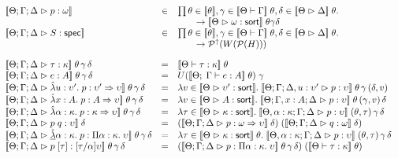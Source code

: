 \begin{figure}
\begin{displaymath}
\begin{array}{lcl}
\interp{\judgeA{p}{\omega}} & \in & \prod \theta \in \interp{\theta}, \gamma \in \interp{\judgectx{\Theta}{\Gamma}}\;\theta, \delta \in \interp{\judgeACtx{\Delta}}\;\theta.\\
                            &     & \qquad \to \interp{\judgeSort{\omega}}\;\theta \gamma \delta \\
\interp{\judgeS{S}}         & \in & \prod \theta \in \interp{\theta}, \gamma \in \interp{\judgectx{\Theta}{\Gamma}}\;\theta, \delta \in \interp{\judgeACtx{\Delta}}\;\theta.\\
                            &     &\qquad\to \upset{W(\powerset{H})} \\[1em]

\interp{\judgeA{\tau}{\kappa}}\;\theta\,\gamma\,\delta & = & \interp{\judgeWK{\tau}{\kappa}}\;\theta \\

\interp{\judgeA{e}{A}}\;\theta\,\gamma\,\delta & = &  U(\interp{\judgeE{\Gamma}{e}{A}}\;\theta)\;\gamma \\

\interp{\judgeA{\pfun{u}{\upsilon'}{p}}{\upsilon' \To \upsilon}}\;\theta\,\gamma\,\delta & = & 
   \semfun{v \in \interp{\judgeSort{\upsilon'}}}
          {\interp{\judgeA[\Theta; \Gamma; \Delta,u:\upsilon']{p}{\upsilon}}\;\theta\,\gamma\,(\delta, v)} \\

\interp{\judgeA{\pfun{x}{A}{p}}{A \To \upsilon}}\;\theta\,\gamma\,\delta & = & 
   \semfun{v \in \interp{\judgeSort{A}}}
          {\interp{\judgeA[\Theta;\Gamma,x:A;\Delta]{p}{\upsilon}}\;\theta\,(\gamma,v)\,\delta} \\

\interp{\judgeA{\pfun{\alpha}{\kappa}{p}}{\kappa \To \upsilon}}\;\theta\,\gamma\,\delta & = & 
   \semfun{\tau \in \interp{\judgeSort{\kappa}}}
          {\interp{\judgeA[\Theta, \alpha:\kappa;\Gamma;\Delta]{p}{\upsilon}}\;(\theta,\tau)\,\gamma\,\delta} \\

\interp{\judgeA{p\;q}{\upsilon}}\;\delta & = & 
   (\interp{\judgeA{p}{\omega \To \upsilon}}\;\delta)\;(\interp{\judgeA{q}{\omega}}\;\delta) \\

\interp{\judgeA{\pfunall{\alpha}{\kappa}{p}}{\forallsort{\alpha}{\kappa}{\upsilon}}}\;\theta\,\gamma\,\delta & = &
   \semfun{\tau \in \interp{\judgeSort{\kappa}}\;\theta}
          {\interp{\judgeA[\Theta, \alpha:\kappa; \Gamma; \Delta]{p}{\upsilon}}\;(\theta,\tau)\,\gamma\,\delta}
\\
\interp{\judgeA{p\;[\tau]}{[\tau/\alpha]\upsilon}}\;\theta\,\gamma\,\delta & = & 
   (\interp{\judgeA{p}{\forallsort{\alpha}{\kappa}{\upsilon}}}\;\theta\,\gamma\,\delta)\;
   (\interp{\judgeWK{\tau}{\kappa}}\;\theta) \\



\end{array}
\end{displaymath}
\end{figure}
